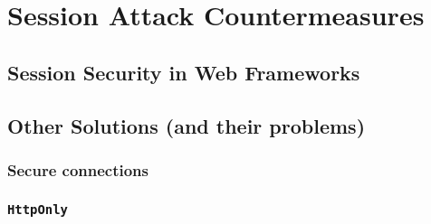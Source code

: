 \chapter{Session Attack Countermeasures}

\section{Session Security in Web Frameworks}\label{frameworks}

\section{Other Solutions (and their problems)}\label{other-solutions}

\subsection{Secure connections}\label{ssl}

\subsection{\texttt{HttpOnly}}\label{httponly}
